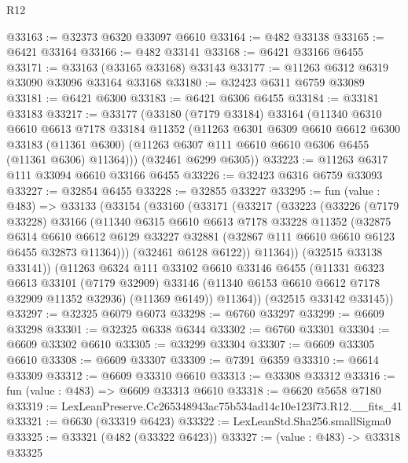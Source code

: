 \begin{lexlean}{R12}
\begin{coremodule}
@33163 := @32373 @6320 @33097 @6610
@33164 := @482 @33138
@33165 := @6421 @33164
@33166 := @482 @33141
@33168 := @6421 @33166 @6455
@33171 := @33163 (@33165 @33168) @33143
@33177 := @11263 @6312 @6319 @33090 @33096 @33164 @33168
@33180 := @32423 @6311 @6759 @33089
@33181 := @6421 @6300
@33183 := @6421 @6306 @6455
@33184 := @33181 @33183
@33217 := @33177
    (@33180
      (@7179 @33184)
      @33164
      (@11340
        @6310
        @6610
        @6613
        @7178
        @33184
        @11352
        (@11263
          @6301
          @6309
          @6610
          @6612
          @6300
          @33183
          (@11361 @6300)
          (@11263 @6307 @111 @6610 @6610 @6306 @6455 (@11361 @6306) @11364)))
      (@32461 @6299 @6305))
@33223 := @11263 @6317 @111 @33094 @6610 @33166 @6455
@33226 := @32423 @6316 @6759 @33093
@33227 := @32854 @6455
@33228 := @32855 @33227
@33295 := fun (value : @483) =>
  @33133
    (@33154
      (@33160
        (@33171
          (@33217
            (@33223
              (@33226
                (@7179 @33228)
                @33166
                (@11340
                  @6315
                  @6610
                  @6613
                  @7178
                  @33228
                  @11352
                  (@32875
                    @6314
                    @6610
                    @6612
                    @6129
                    @33227
                    @32881
                    (@32867 @111 @6610 @6610 @6123 @6455 @32873 @11364)))
                (@32461 @6128 @6122))
              @11364))
          (@32515 @33138 @33141))
        (@11263
          @6324
          @111
          @33102
          @6610
          @33146
          @6455
          (@11331
            @6323
            @6613
            @33101
            (@7179 @32909)
            @33146
            (@11340 @6153 @6610 @6612 @7178 @32909 @11352 @32936)
            (@11369 @6149))
          @11364))
      (@32515 @33142 @33145))
@33297 := @32325 @6079 @6073
@33298 := @6760 @33297
@33299 := @6609 @33298
@33301 := @32325 @6338 @6344
@33302 := @6760 @33301
@33304 := @6609 @33302 @6610
@33305 := @33299 @33304
@33307 := @6609 @33305 @6610
@33308 := @6609 @33307
@33309 := @7391 @6359
@33310 := @6614 @33309
@33312 := @6609 @33310 @6610
@33313 := @33308 @33312
@33316 := fun (value : @483) => @6609 @33313 @6610
@33318 := @6620 @5658 @7180
@33319 := LexLeanPreserve.Cc265348943ac75b534ad14c10e123f73.R12.__fits_41
@33321 := @6630 (@33319 @6423)
@33322 := LexLeanStd.Sha256.smallSigma0
@33325 := @33321 (@482 (@33322 @6423))
@33327 := (value : @483) -> @33318 @33325

\end{coremodule}
\end{lexlean}
